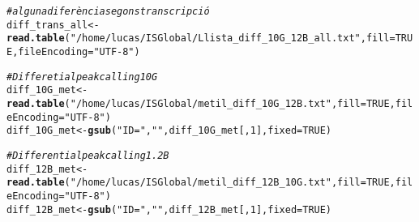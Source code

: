 \documentclass{article}\usepackage[]{graphicx}\usepackage[]{color}
\makeatletter
\newcommand{\hlnum}[1]{\textcolor[rgb]{0.686,0.059,0.569}{#1}}%
\newcommand{\hlstr}[1]{\textcolor[rgb]{0.192,0.494,0.8}{#1}}%
\newcommand{\hlcom}[1]{\textcolor[rgb]{0.678,0.584,0.686}{\textit{#1}}}%
\newcommand{\hlstd}[1]{\textcolor[rgb]{0.345,0.345,0.345}{#1}}%
\newcommand{\hlkwb}[1]{\textcolor[rgb]{0.69,0.353,0.396}{#1}}%
\newcommand{\hlkwc}[1]{\textcolor[rgb]{0.333,0.667,0.333}{#1}}%
\newcommand{\hlkwd}[1]{\textcolor[rgb]{0.737,0.353,0.396}{\textbf{#1}}}%
\newenvironment{kframe}{%
 \def\at@end@of@kframe{}%
 \ifinner\ifhmode%
  \def\at@end@of@kframe{\end{minipage}}%
  \begin{minipage}{\columnwidth}%
 \fi\fi%
 \def\FrameCommand##1{\hskip\@totalleftmargin \hskip-\fboxsep
 \colorbox{shadecolor}{##1}\hskip-\fboxsep
     \hskip-\linewidth \hskip-\@totalleftmargin \hskip\columnwidth}%
 \MakeFramed {\advance\hsize-\width
   \@totalleftmargin\z@ \linewidth\hsize
   \@setminipage}}%
 {\par\unskip\endMakeFramed%
 \at@end@of@kframe}
\newenvironment{knitrout}{}{} %
\makeatother
\begin{document}
\begin{knitrout}
\color{fgcolor}\begin{kframe}
\begin{alltt}
\hlcom{# alguna diferència segons transcripció}
\hlstd{diff_trans_all} \hlkwb{<-} \hlkwd{read.table}\hlstd{(}\hlstr{"/home/lucas/ISGlobal/Llista_diff_10G_12B_all.txt"}\hlstd{,} \hlkwc{fill} \hlstd{=} \hlnum{TRUE}\hlstd{,} \hlkwc{fileEncoding} \hlstd{=} \hlstr{"UTF-8"}\hlstd{)}

\hlcom{# Differetial peak calling 10G}
\hlstd{diff_10G_met} \hlkwb{<-} \hlkwd{read.table}\hlstd{(}\hlstr{"/home/lucas/ISGlobal/metil_diff_10G_12B.txt"}\hlstd{,} \hlkwc{fill} \hlstd{=} \hlnum{TRUE}\hlstd{,} \hlkwc{fileEncoding} \hlstd{=} \hlstr{"UTF-8"}\hlstd{)}
\hlstd{diff_10G_met} \hlkwb{<-} \hlkwd{gsub}\hlstd{(}\hlstr{"ID="}\hlstd{,} \hlstr{""}\hlstd{, diff_10G_met[,}\hlnum{1}\hlstd{],} \hlkwc{fixed} \hlstd{=} \hlnum{TRUE}\hlstd{)}

\hlcom{# Differential peak calling 1.2B}
\hlstd{diff_12B_met} \hlkwb{<-} \hlkwd{read.table}\hlstd{(}\hlstr{"/home/lucas/ISGlobal/metil_diff_12B_10G.txt"}\hlstd{,} \hlkwc{fill} \hlstd{=} \hlnum{TRUE}\hlstd{,} \hlkwc{fileEncoding} \hlstd{=} \hlstr{"UTF-8"}\hlstd{)}
\hlstd{diff_12B_met} \hlkwb{<-} \hlkwd{gsub}\hlstd{(}\hlstr{"ID="}\hlstd{,} \hlstr{""}\hlstd{, diff_12B_met[,}\hlnum{1}\hlstd{],} \hlkwc{fixed} \hlstd{=} \hlnum{TRUE}\hlstd{)}


\end{alltt}
\end{kframe}
\end{knitrout}
\end{document}
